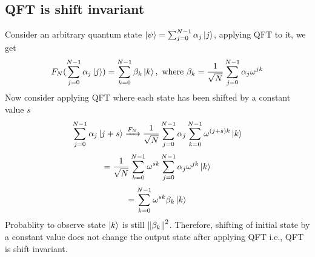 \documentclass[11.5pt, paper=a4]{article}
\theoremstyle{definition}
\numberwithin{theorem}{section}
\begin{document}
\subsection{QFT is shift invariant}
\label{subsec:QFT is shift invariant}
Consider an arbitrary quantum state $\ket{\psi} = \sum_{j=0}^{N-1}\alpha_j\ket{j}$, applying QFT to it, we get
\begin{equation*}
    F_N(\sum_{j=0}^{N-1}\alpha_j\ket{j}) = \sum_{k=0}^{N-1}\beta_k\ket{k}, \text{ where } \beta_k=\frac{1}{\sqrt{N}}\sum_{j=0}^{N-1}\alpha_j\omega^{jk}
\end{equation*}
Now consider applying QFT where each state has been shifted by a constant value $s$
\begin{equation*}
    \sum_{j=0}^{N-1}\alpha_j\ket{j+s} \xrightarrow{F_N} \frac{1}{\sqrt{N}}\sum_{j=0}^{N-1}\alpha_j\sum_{k=0}^{N-1}\omega^{(j+s)k}\ket{k}
\end{equation*}
\begin{equation*}
    = \frac{1}{\sqrt{N}}\sum_{k=0}^{N-1}\omega^{sk}\sum_{j=0}^{N-1}\alpha_j\omega^{jk}\ket{k}
\end{equation*}
\begin{equation*}
    = \sum_{k=0}^{N-1}\omega^{sk}\beta_k\ket{k}
\end{equation*}
Probablity to observe state $\ket{k}$ is still $\norm{\beta_k}^2$. Therefore, shifting of initial state by a constant value does not change the output state after applying QFT i.e., QFT is shift invariant.
\end{document}
